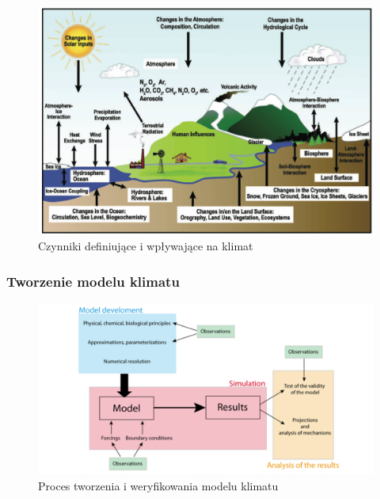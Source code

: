 \documentclass{beamer}
\begin{document}
\begin{frame}
	\frametitle{}
	\begin{figure}[h]
		\begin{center}
			\includegraphics[width=0.9\linewidth]{images/Figure1}
			\caption{Czynniki definiujące i wpływające na klimat}
		\end{center}
	\end{figure}
\end{frame}

\begin{frame}
	\frametitle{Tworzenie modelu klimatu}
	\begin{figure}[h]
		\begin{center}
			\includegraphics[width=1.0\linewidth]{images/Figure9}
			\caption{Proces tworzenia i weryfikowania modelu klimatu}
		\end{center}
	\end{figure}
\end{frame}
\end{document}
